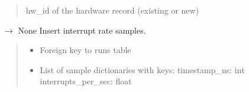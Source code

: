 \documentclass[letterpaper,10pt,english]{sphinxmanual}
\begin{document}
\begin{fulllineitems}
\begin{fulllineitems}
\begin{quote}
\begin{description}
\sphinxAtStartPar
hw\_id of the hardware record (existing or new)

\end{description}\end{quote}

\end{fulllineitems}


\begin{fulllineitems}
\label{\detokenize{core.database.base:core.database.base.DatabaseInterface.insert_interrupt_samples}}
\pysigstartsignatures
\pysiglinewithargsret
{}
{\sphinxparamcomma {}}
{{ $\rightarrow$ None}}
\pysigstopsignatures
\sphinxAtStartPar
Insert interrupt rate samples.
\begin{quote}\begin{description}
\begin{itemize}
\item {} 
\sphinxAtStartPar
{} \textendash{} Foreign key to runs table

\item {} 
\sphinxAtStartPar
{} \textendash{} List of sample dictionaries with keys:
\sphinxhyphen{} timestamp\_ns: int
\sphinxhyphen{} interrupts\_per\_sec: float

\end{itemize}

\end{description}\end{quote}

\end{fulllineitems}



\end{fulllineitems}
\end{document}
